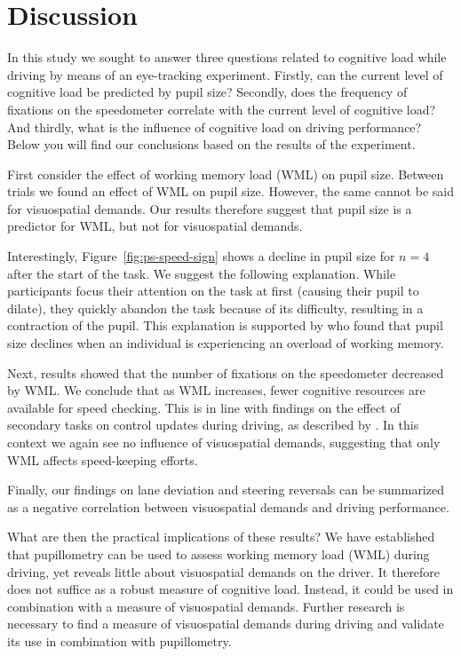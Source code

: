 
\section{Discussion}\label{sec:discussion}
In this study we sought to answer three questions related to cognitive load while driving by means of an eye-tracking experiment.
Firstly, can the current level of cognitive load be predicted by pupil size? 
Secondly, does the frequency of fixations on the speedometer correlate with the current level of cognitive load?
And thirdly, what is the influence of cognitive load on driving performance?
Below you will find our conclusions based on the results of the experiment.

First consider the effect of working memory load (WML) on pupil size.
Between trials we found an effect of WML on pupil size. 
However, the same cannot be said for visuospatial demands. 
Our results therefore suggest that pupil size is a predictor for WML, but not for visuospatial demands.

Interestingly, Figure~\ref{fig:ps-speed-sign} shows a decline in pupil size for \(n=4\) after the start of the \nback task.
We suggest the following explanation.
While participants focus their attention on the task at first (causing their pupil to dilate), they quickly abandon the task because of its difficulty, resulting in a contraction of the pupil.
This explanation is supported by \citet{Granholm1996} who found that pupil size declines when an individual is experiencing an overload of working memory.

Next, results showed that the number of fixations on the speedometer decreased by WML.\@
We conclude that as WML increases, fewer cognitive resources are available for speed checking.
This is in line with findings on the effect of secondary tasks on control updates during driving, as described by \citet{Salvucci2011}.
In this context we again see no influence of visuospatial demands, suggesting that only WML affects speed-keeping efforts.

Finally, our findings on lane deviation and steering reversals can be summarized as a negative correlation between visuospatial demands and driving performance.

What are then the practical implications of these results? 
We have established that pupillometry can be used to assess working memory load (WML) during driving, yet reveals little about visuospatial demands on the driver.
It therefore does not suffice as a robust measure of cognitive load.
Instead, it could be used in combination with a measure of visuospatial demands.
Further research is necessary to find a measure of visuospatial demands during driving and validate its use in combination with pupillometry.

